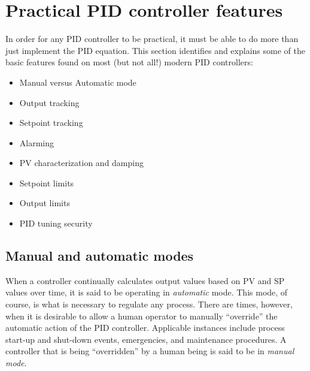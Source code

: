 \filbreak
\section{Practical PID controller features}

In order for any PID controller to be practical, it must be able to do more than just implement the PID equation.  This section identifies and explains some of the basic features found on most (but not all!) modern PID controllers:

\begin{itemize}
\item Manual versus Automatic mode
\item Output tracking
\item Setpoint tracking
\item Alarming
\item PV characterization and damping 
\item Setpoint limits
\item Output limits
\item PID tuning security
\end{itemize}



\filbreak
\subsection{Manual and automatic modes}

When a controller continually calculates output values based on PV and SP values over time, it is said to be operating in \textit{automatic} mode.  This mode, of course, is what is necessary to regulate any process.  There are times, however, when it is desirable to allow a human operator to manually ``override'' the automatic action of the PID controller.  Applicable instances include process start-up and shut-down events, emergencies, and maintenance procedures.  A controller that is being ``overridden'' by a human being is said to be in \textit{manual mode}.    

